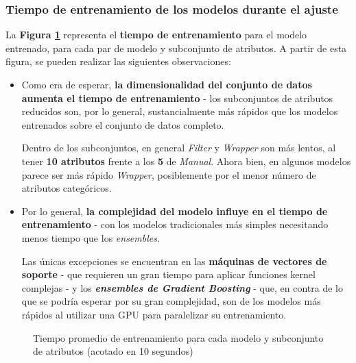 \subsubsection{Tiempo de entrenamiento de los modelos durante el ajuste}

La \textbf{Figura \ref{fig:ch5traintime}} representa el \textbf{tiempo de entrenamiento} para el modelo entrenado, para cada par de modelo y subconjunto de atributos. A partir de esta figura, se pueden realizar las siguientes observaciones:

\begin{itemize}[leftmargin=*, parsep=2pt, itemsep=4pt, topsep=1pt]
	\item Como era de esperar, \textbf{la dimensionalidad del conjunto de datos aumenta el tiempo de entrenamiento} - los subconjuntos de atributos reducidos son, por lo general, sustancialmente más rápidos que los modelos entrenados sobre el conjunto de datos completo.
	
	Dentro de los subconjuntos, en general \textit{Filter} y \textit{Wrapper} son más lentos, al tener \textbf{10 atributos} frente a los \textbf{5} de \textit{Manual}. Ahora bien, en algunos modelos parece ser más rápido \textit{Wrapper}, posiblemente por el menor número de atributos categóricos.
	
	\item Por lo general, \textbf{la complejidad del modelo influye en el tiempo de entrenamiento} - con los modelos tradicionales más simples necesitando menos tiempo que los \textit{ensembles.}
	
	Las únicas excepciones se encuentran en las \textbf{máquinas de vectores de soporte} - que requieren un gran tiempo para aplicar funciones kernel complejas - y los \textbf{\textit{ensembles de Gradient Boosting}} - que, en contra de lo que se podría esperar por su gran complejidad, son de los modelos más rápidos al utilizar una GPU para paralelizar su entrenamiento.
\end{itemize}

\begin{figure}[h]
	\vspace{-6mm}
	\centering
	\captionsetup{belowskip=-40pt, justification=centering}
	\caption{Tiempo promedio de entrenamiento para cada modelo y subconjunto de atributos (acotado en 10 segundos)}
	\label{fig:ch5traintime}
\end{figure}


